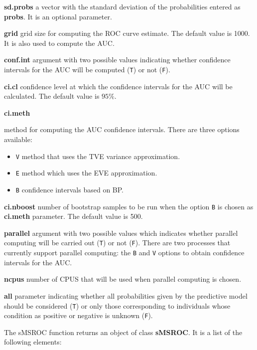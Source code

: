 \begin{itemize}
{\item{\textbf{sd.probs}} {a vector with the standard deviation of the probabilities entered as {\textbf{probs}}. It is an optional parameter.}
\item{\textbf{grid}} {grid size for computing the ROC curve estimate. The default value is 1000. It is also used to compute the AUC.}
\item{\textbf{conf.int}} {argument with two possible values indicating whether confidence intervals for the AUC will be computed (\texttt{T}) or not  (\texttt{F}).}
\item{\textbf{ci.cl}} {confidence level at which the confidence intervals for the AUC will be calculated. The default value is $95\%$.}
\item{\textbf{ci.meth}} {method for computing the AUC confidence intervals. There are three options available:
\begin{itemize}
\renewcommand{\labelitemii}{-}
\item{\texttt{V}} {method that uses the TVE variance approximation.}
\item{\texttt{E}} {method which uses the EVE approximation.}
\item{\texttt{B}} {confidence intervals based on BP.}
\end{itemize}}
} 
\item{\textbf{ci.nboost}} {number of bootstrap samples to be run when the option \texttt{B} is chosen as {\textbf{ci.meth}} parameter. The default value is 500.}
\item{\textbf{parallel}} {argument with two possible values which indicates whether parallel computing will be carried out (\texttt{T}) or not (\texttt{F}). There are two processes that currently support parallel computing: the \texttt{B} and \texttt{V} options to obtain confidence intervals for the AUC.}
\item{\textbf{ncpus}} {number of CPUS that will be used when parallel computing is chosen.}
\item{\textbf{all}} {parameter indicating whether all probabilities given by the predictive model should be considered (\texttt{T}) or only those corresponding to individuals whose condition as positive or negative is unknown (\texttt{F}).}
\end{itemize}

The sMSROC function returns an object of class {\textbf{sMSROC}}. It is a list of the following elements:

